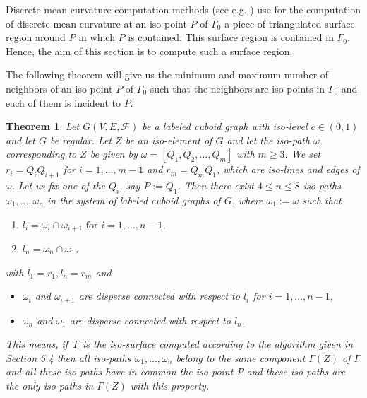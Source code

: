 \documentclass[a4paper,11pt]{article}
\newtheorem{theorem}{Theorem}[section]
\begin{document}
Discrete mean curvature computation methods (see e.g. \cite{Meyer02Vismath}) use for the computation of
discrete mean curvature at an iso-point $P$ of $\Gamma_0$ a piece of triangulated surface region around $P$ in
which $P$ is contained. This surface region is contained in $\Gamma_0$. Hence, the aim of this section is to
compute such a surface region.

The following theorem will give us the minimum and maximum number of neighbors of an iso-point $P$ of
$\Gamma_0$ such that the neighbors are iso-points in $\Gamma_0$ and each of them is incident to $P$.

\begin{theorem}Let $G(V,E,\mathcal{F})$ be a labeled cuboid graph with iso-level $c\in (0,1)$ and let
$G$ be regular. Let $Z$ be an iso-element of $G$ and let the iso-path $\omega$ corresponding to $Z$ be
given by $\omega=[Q_1,Q_2,\ldots,Q_m]$ with $m\geq 3$. We set $r_i=\overline{Q_iQ_{i+1}}$ for
$i=1,\ldots,m-1$ and $r_m=\overline{Q_mQ_1}$, which are iso-lines and edges of $\omega$. Let us fix
one of the $Q_i$, say $P:=Q_1$. Then there exist $4\leq n\leq 8$ iso-paths $\omega_1,\ldots,\omega_n$
in the system of labeled cuboid graphs of $G$, where $\omega_1:=\omega$ such that
\begin{enumerate}
\item $l_i=\omega_i\cap \omega_{i+1} \mbox{ for }i=1,\ldots,n-1$,
\item $l_n=\omega_n\cap \omega_1$,
\end{enumerate}
with $l_1=r_1, l_n=r_m$ and
\begin{itemize}
\item[(i)] $\omega_i$ and $\omega_{i+1}$ are disperse connected with respect to $l_i$ for $i=1,\ldots,n-1$,
\item[(ii)] $\omega_n$ and $\omega_1$ are disperse connected with respect to $l_n$.
\end{itemize}
This means, if $\,\Gamma$ is the iso-surface computed according to the algorithm given in Section 5.4 then all iso-paths
$\omega_1,\ldots,\omega_n$ belong to the same component $\Gamma(Z)$ of $\Gamma$ and all these iso-paths have in
common the iso-point $P$ and these iso-paths are the only iso-paths in $\Gamma(Z)$ with this property.
\label{thm:iso-path-region-curvature}
\end{theorem}
\end{document}
